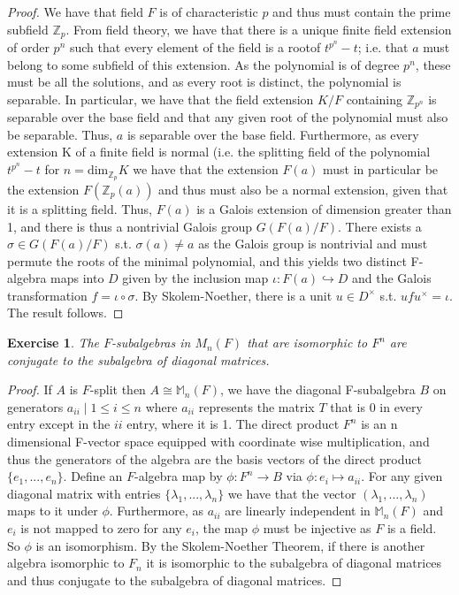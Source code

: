 \documentclass{article}
\newtheorem{exercise}{Exercise}[section]
\begin{document}
\begin{proof}

We have that field $F$ is of characteristic $p$ and thus must contain the prime subfield $\mathbb{Z}_{p}$. From field theory, we have that there is a unique finite field extension of order $p^{n}$ such that every element of the field is a rootof $t^{p^{n}}-t$; i.e. that $a$ must belong to some subfield of this extension. As the polynomial is of degree $p^{n}$, these must be all the solutions, and as every root is distinct, the polynomial is separable. In particular, we have that the field extension $K/F$ containing $\mathbb{Z}_{p^{n}}$ is separable over the base field and that any given root of the polynomial must also be separable. Thus, $a$ is separable over the base field. Furthermore, as every extension K of a finite field is normal (i.e. the splitting field of the polynomial $t^{p^{n}}-t$ for $n = \text{dim}_{\mathbb{Z}_{p}}K$ we have that the extension $F(a)$ must in particular be the extension $F(\mathbb{Z}_{p}(a))$ and thus must also be a normal extension, given that it is a splitting field. Thus, $F(a)$ is a Galois extension of dimension greater than 1, and there is thus a nontrivial Galois group $G(F(a)/F)$. There exists a $\sigma \in G(F(a)/F)$ s.t. $\sigma(a) \neq a$ as the Galois group is nontrivial and must permute the roots of the minimal polynomial, and this yields two distinct F-algebra maps into $D$ given by the inclusion map $\iota: F(a) \hookrightarrow D$ and the Galois transformation $f = \iota \circ \sigma$. By Skolem-Noether, there is a unit $u \in D^{\times}$ s.t. $uf u^{\times} = \iota$. The result follows. \end{proof}


\begin{exercise}
The $F$-subalgebras in $M_{n}(F)$  that are isomorphic to $F^{n}$ are conjugate
to the subalgebra of diagonal matrices.
\end{exercise}
\begin{proof}

  If $A$ is $F$-split then $A \cong \mathbb{M}_{n}(F)$, we have the diagonal F-subalgebra $B$ on generators ${a_{ii} \mid 1 \leq i \leq n}$ where $a_{ii}$ represents the matrix $T$ that is 0 in every entry except in the $ii$ entry, where it is 1. The direct product $F^{n}$ is an n dimensional F-vector space equipped with coordinate wise multiplication, and thus the generators of the algebra are the basis vectors of the direct product $\{e_{1},...,e_{n}\}$. Define an $F$-algebra map by $\phi:F^{n} \to B$ via $\phi: e_{i} \mapsto a_{ii}$. For any given diagonal matrix with entries $\{\lambda_{1},...,\lambda_{n}\}$ we have that the vector $(\lambda_{1},...,\lambda_{n})$ maps to it under $\phi$. Furthermore, as $a_{ii}$ are linearly independent in $\mathbb{M}_{n}(F)$ and $e_{i}$ is not mapped to zero for any $e_{i}$, the map $\phi$ must be injective as $F$ is a field. So $\phi$ is an isomorphism. By the Skolem-Noether Theorem, if there is another algebra isomorphic to $F_{n}$ it is isomorphic to the subalgebra of diagonal matrices and thus conjugate to the subalgebra of diagonal matrices.
  
\end{proof}
\end{document}
